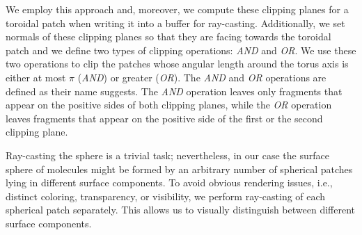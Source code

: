We employ this approach and, moreover, we compute these clipping planes for a toroidal patch when writing it into a buffer for ray-casting.
Additionally, we set normals of these clipping planes so that they are facing towards the toroidal patch and we define two types of clipping operations: \textit{AND} and \textit{OR}.
We use these two operations to clip the patches whose angular length around the torus axis is either at most $\pi$ (\textit{AND}) or greater (\textit{OR}).
The \textit{AND} and \textit{OR} operations are defined as their name suggests.
The \textit{AND} operation leaves only fragments that appear on the positive sides of both clipping planes, while the \textit{OR} operation leaves fragments that appear on the positive side of the first or the second clipping plane.




Ray-casting the sphere is a trivial task; nevertheless, in our case the surface sphere of molecules might be formed by an arbitrary number of spherical patches lying in different surface components. To avoid obvious rendering issues, i.e., distinct coloring, transparency, or visibility, we perform ray-casting of each spherical patch separately.
This allows us to visually distinguish between different surface components.

